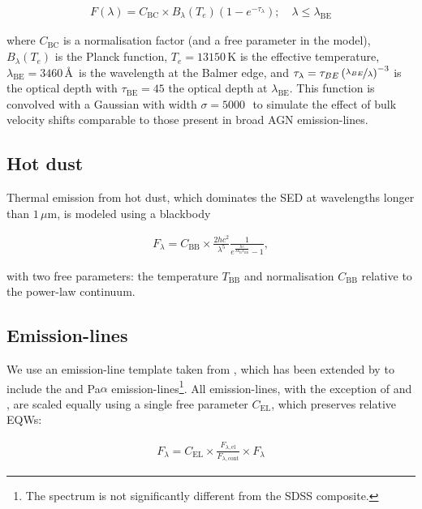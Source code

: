 \begingroup\makeatletter{}\check@mathfonts
\begin{eqnarray}
  F(\lambda) = C_{\text{BC}} \times B_\lambda(T_e)(1-e^{-\tau_\lambda}); \quad \lambda \leq \lambda_{\text{BE}}
\end{eqnarray}
\endgroup

\noindent where $C_{\text{BC}}$ is a normalisation factor (and a free parameter in the model), $B_\lambda(T_e)$ is the Planck function, $T_e=13150$\,K is the effective temperature, $\lambda_{\text{BE}}=3460$\,\AA\, is the wavelength at the Balmer edge, and $\tau_\lambda = \tau_{BE}\left( \nicefrac{\lambda_{BE}} {\lambda} \right)^{-3}$ is the optical depth with $\tau_{\text{BE}}=45$ the optical depth at $\lambda_{\text{BE}}$. 
This function is convolved with a Gaussian with width $\sigma=5000$\,\kms\, to simulate the effect of bulk velocity shifts comparable to those present in broad AGN emission-lines. 

\subsection{Hot dust}

Thermal emission from hot dust, which dominates the SED at wavelengths longer than $1$\,$\mu$m, is modeled using a blackbody

\begingroup\makeatletter{}\check@mathfonts
\begin{eqnarray}  
  F_\lambda = C_{\text{BB}} \times \frac{2 hc^2}{\lambda^5}\frac{1}{ e^{\frac{hc}{\lambda k_\text{B}T_{\text{BB}}}} - 1}, 
\end{eqnarray}
\endgroup

\noindent with two free parameters: the temperature $T_{\text{BB}}$ and normalisation $C_{\text{BB}}$ relative to the power-law continuum. 

\subsection{Emission-lines}

We use an emission-line template taken from \citet{francis91}, which has been extended by \citet{maddox06} to include the \ha and Pa$\alpha$ emission-lines\footnote{The spectrum is not significantly different from the \citet{vandenberk01} SDSS composite.}. 
All emission-lines, with the exception of \ha and \hbns, are scaled equally using a single free parameter $C_{\text{EL}}$, which preserves relative EQWs:

\begingroup\makeatletter{}\check@mathfonts
\begin{eqnarray}
  F_{\lambda} =  C_{\text{EL}} \times \frac{F_{\lambda, \text{el}}}{F_{\lambda, \text{cont}}} \times F_{\lambda} 
\end{eqnarray} 
\endgroup

